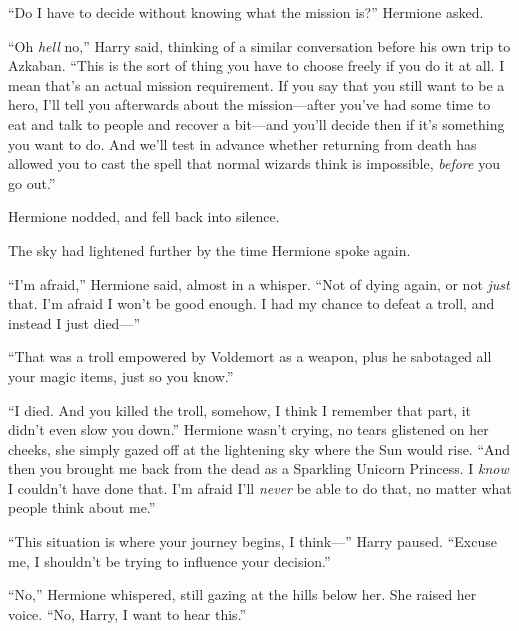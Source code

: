 “Do I have to decide without knowing what the mission is?” Hermione asked.

“Oh \emph{hell} no,” Harry said, thinking of a similar conversation before his own trip to Azkaban. “This is the sort of thing you have to choose freely if you do it at all. I mean that’s an actual mission requirement. If you say that you still want to be a hero, I’ll tell you afterwards about the mission—after you’ve had some time to eat and talk to people and recover a bit—and you’ll decide then if it’s something you want to do. And we’ll test in advance whether returning from death has allowed you to cast the spell that normal wizards think is impossible, \emph{before} you go out.”

Hermione nodded, and fell back into silence.

The sky had lightened further by the time Hermione spoke again.

“I’m afraid,” Hermione said, almost in a whisper. “Not of dying again, or not \emph{just} that. I’m afraid I won’t be good enough. I had my chance to defeat a troll, and instead I just died—”

“That was a troll empowered by Voldemort as a weapon, plus he sabotaged all your magic items, just so you know.”

“I died. And you killed the troll, somehow, I think I remember that part, it didn’t even slow you down.” Hermione wasn’t crying, no tears glistened on her cheeks, she simply gazed off at the lightening sky where the Sun would rise. “And then you brought me back from the dead as a Sparkling Unicorn Princess. I \emph{know} I couldn’t have done that. I’m afraid I’ll \emph{never} be able to do that, no matter what people think about me.”

“This situation is where your journey begins, I think—” Harry paused. “Excuse me, I shouldn’t be trying to influence your decision.”

“No,” Hermione whispered, still gazing at the hills below her. She raised her voice. “No, Harry, I want to hear this.”

